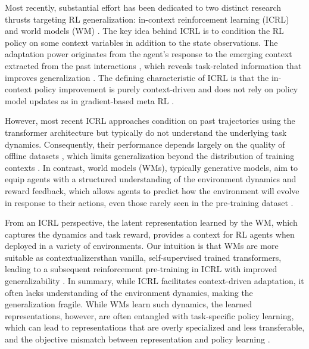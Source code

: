\documentclass[letterpaper]{article} %
\begin{document}
Most recently, substantial effort has been dedicated to two distinct research thrusts targeting RL generalization: in-context reinforcement learning (ICRL) \cite{laskin2023incontext} and world models (WM) \cite{silver20wm, hafner25worldmodel}. The key idea behind ICRL is to condition the RL policy on some context variables in addition to the state observations. The adaptation power originates from the agent's response to the emerging context extracted from the past interactions \cite{laskin2023incontext, tao23sce}, which reveals task-related information that improves generalization \cite{tao23cola}. The defining characteristic of ICRL is that the in-context policy improvement is purely context-driven and does not rely on policy model updates as in gradient-based meta RL \cite{finn17maml, fallah2021convergence, tao2024meta, pan-tao25meta-lqr}.

However, most recent ICRL approaches condition on past trajectories using the transformer architecture \cite{vaswani2017attention} but typically do not understand the underlying task dynamics. Consequently, their performance depends largely on the quality of offline datasets \cite{chen2021dt}, which limits generalization beyond the distribution of training contexts \cite{chen2024deep_survery}. In contrast, world models (WMs), typically generative models, aim to equip agents with a structured understanding of the environment dynamics and reward feedback, which allows agents to predict how the environment will evolve in response to their actions, even those rarely seen in the pre-training dataset  \cite{hafnerdream, hafner25worldmodel}. 

From an ICRL perspective, the latent representation learned by the WM, which captures the dynamics and task reward, provides a context for RL agents when deployed in a variety of environments. Our intuition is that WMs are more suitable as contextualizersthan vanilla, self-supervised trained transformers, leading to a subsequent reinforcement pre-training in ICRL with improved generalizability \cite{moeini2025survey}. In summary, while ICRL facilitates context-driven adaptation, it often lacks understanding of the environment dynamics, making the generalization fragile. While WMs learn such dynamics, the learned representations, however, are often entangled with task-specific policy learning, which can lead to representations that are overly specialized and less transferable, and the objective mismatch between representation and policy learning \cite{eysenbach2022joint}.
\end{document}

